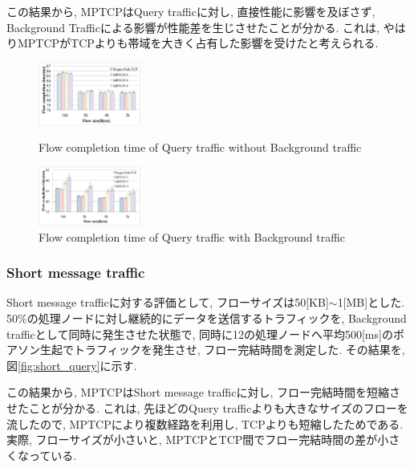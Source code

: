 \documentclass[10pt, a4paper, twocolumn]{jsarticle}
\begin{document}
この結果から, MPTCPはQuery trafficに対し, 直接性能に影響を及ぼさず, Background
Trafficによる影響が性能差を生じさせたことが分かる.
これは, やはりMPTCPがTCPよりも帯域を大きく占有した影響を受けたと考えられる.
\begin{figure}[h]
 \begin{minipage}{0.49\hsize}
  \begin{center}
    \includegraphics[autoebb, width=95pt]{./img/pure_query.pdf}
    \caption{Flow completion time of Query traffic without Background traffic}
    \label{fig:pure_query}
    \end{center}
 \end{minipage}
 \begin{minipage}{0.49\hsize}
  \begin{center}
    \includegraphics[autoebb, width=95pt]{./img/mix_query.pdf}
    \caption{Flow completion time of Query
    traffic with Background traffic}
    \label{fig:mix_query}
    \end{center}
 \end{minipage}
\end{figure}

\subsubsection{Short message traffic}
Short message trafficに対する評価として, フローサイズは50[KB]$\sim$1[MB]とした.
50\%の処理ノードに対し継続的にデータを送信するトラフィックを, Background trafficとして同時に発生させた状態で,
同時に12の処理ノードへ平均500[ms]のポアソン生起でトラフィックを発生させ, フロー完結時間を測定した.
その結果を, 図\ref{fig:short_query}に示す.

この結果から, MPTCPはShort message trafficに対し, フロー完結時間を短縮させたことが分かる.
これは, 先ほどのQuery trafficよりも大きなサイズのフローを流したので, MPTCPにより複数経路を利用し, TCPよりも短縮したためである.
実際, フローサイズが小さいと, MPTCPとTCP間でフロー完結時間の差が小さくなっている.
\end{document}
